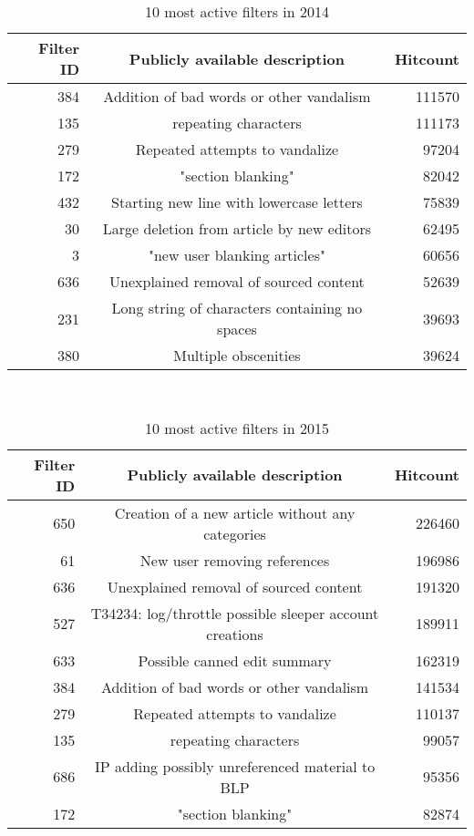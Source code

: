 \begin{table}
  \centering
  \begin{tabular}{r c r }
    Filter ID & Publicly available description & Hitcount \\
    \hline
    384 & Addition of bad words or other vandalism & 111570 \\
    135 & repeating characters & 111173 \\
    279 & Repeated attempts to vandalize & 97204 \\
    172 & "section blanking" & 82042 \\
    432 & Starting new line with lowercase letters & 75839 \\
    30  & Large deletion from article by new editors & 62495 \\
    3 & "new user blanking articles" & 60656 \\
    636 & Unexplained removal of sourced content & 52639 \\
    231 & Long string of characters containing no spaces & 39693 \\
    380 & Multiple obscenities & 39624 \\
  \end{tabular}
  \caption{10 most active filters in 2014}~\label{tab:most-active-2014}
\end{table}

\begin{table}
  \centering
  \begin{tabular}{r c r }
    Filter ID & Publicly available description & Hitcount \\
    \hline
    650 & Creation of a new article without any categories & 226460 \\
    61 & New user removing references & 196986 \\
    636 & Unexplained removal of sourced content & 191320 \\
    527 & T34234: log/throttle possible sleeper account creations & 189911 \\
    633 & Possible canned edit summary & 162319 \\
    384 & Addition of bad words or other vandalism & 141534 \\
    279 & Repeated attempts to vandalize & 110137 \\
    135 & repeating characters & 99057 \\
    686 & IP adding possibly unreferenced material to BLP & 95356 \\
    172 & "section blanking" & 82874 \\
  \end{tabular}
  \caption{10 most active filters in 2015}~\label{tab:most-active-2015}
\end{table}

